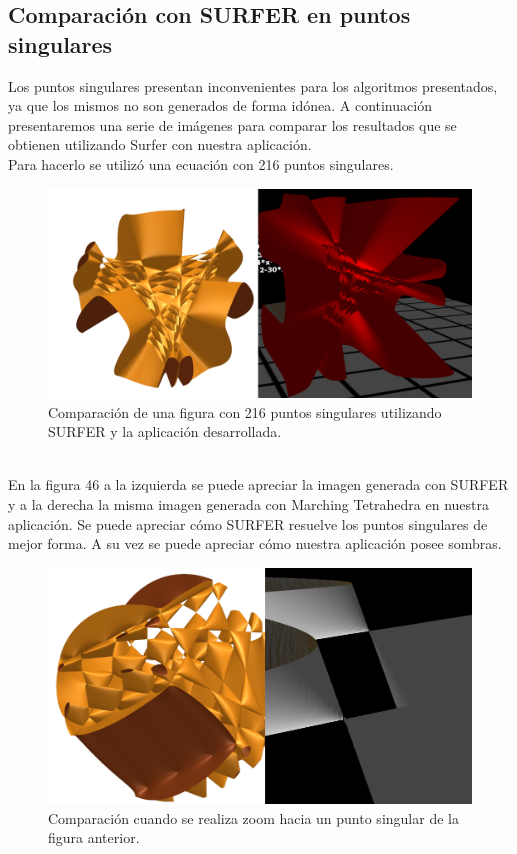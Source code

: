 \documentclass[12pt]{article}
\begin{document}
\subsection{Comparación con SURFER en puntos singulares}
Los puntos singulares presentan inconvenientes para los algoritmos presentados, ya que los mismos no son generados de forma idónea. A continuación presentaremos una serie de imágenes para comparar los resultados que se obtienen utilizando Surfer con nuestra aplicación. 
\\Para hacerlo se utilizó una ecuación con 216 puntos singulares.\\
\begin{figure}[h!]
\includegraphics[width=\linewidth]{comp1.png}
\caption{Comparación de una figura con 216 puntos singulares utilizando SURFER y la aplicación desarrollada.}
\end{figure}
\\En la figura 46 a la izquierda se puede apreciar la imagen generada con SURFER y a la derecha la misma imagen generada con Marching Tetrahedra en nuestra aplicación. Se puede apreciar cómo SURFER resuelve los puntos singulares de mejor forma. A su vez se puede apreciar cómo nuestra aplicación posee sombras.
\clearpage
\begin{figure}[h!]
\includegraphics[width=\linewidth]{comp2.png}
\caption{Comparación cuando se realiza zoom hacia un punto singular de la figura anterior.}
\end{figure}
\end{document}
